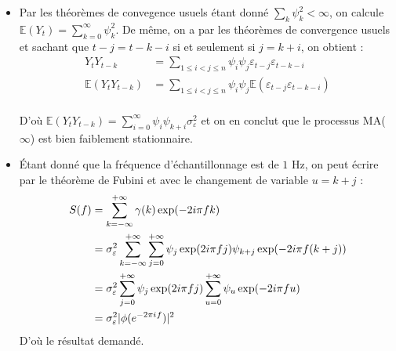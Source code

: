 \documentclass[11pt]{article}
\begin{document}
\begin{solution}  %

\begin{itemize}
    \item Par les théorèmes de convegence usuels étant donné $\sum_k \psi_k^2 < \infty$, on calcule $\mathbb{E}(Y_t) = \sum_{k=0}^{\infty} \psi_k^2$. De même, on a par les théorèmes de convergence usuels et sachant que $t-j = t-k-i$ si et seulement si $j = k+i$, on obtient :
    \begin{align*}
        Y_t Y_{t-k} & = \sum_{1 \leq i < j \leq n} \psi_i \psi_j \varepsilon_{t-j} \varepsilon_{t-k-i}\\
        \mathbb{E}(Y_t Y_{t-k}) & = \sum_{1 \leq i < j \leq n} \psi_i \psi_j \mathbb{E}(\varepsilon_{t-j}\varepsilon_{t-k-i})\\
    \end{align*}

    D'où $\mathbb{E}(Y_t Y_{t-k}) = \sum_{i=0}^{\infty} \psi_i \psi_{k+i} \sigma_{\varepsilon}^2$ et on en conclut que le processus MA($\infty$) est bien faiblement stationnaire.

    \item Étant donné que la fréquence d'échantillonnage est de $1$ Hz, on peut écrire par le théorème de Fubini et avec le changement de variable $u = k + j$ :
    \begin{align*}
        S(f) & = \sum_{k = -\infty}^{+\infty} \gamma(k) \exp(-2i \pi f k)\\
        & = \sigma_{\varepsilon}^2 \sum_{k = -\infty}^{+\infty} \sum_{j = 0}^{+ \infty} \psi_j \exp(2i \pi f j) \psi_{k+j} \exp(-2i \pi f (k+j))\\
        & = \sigma_{\varepsilon}^2 \sum_{j = 0}^{+ \infty} \psi_j \exp(2i \pi f j) \sum_{u = 0}^{+\infty} \psi_{u} \exp(-2i \pi f u)\\
        & = \sigma_{\varepsilon}^2|\phi(e^{-2\pi{i\mkern1mu} f})|^2
    \end{align*}
    D'où le résultat demandé.
\end{itemize}

\end{solution}
\end{document}
